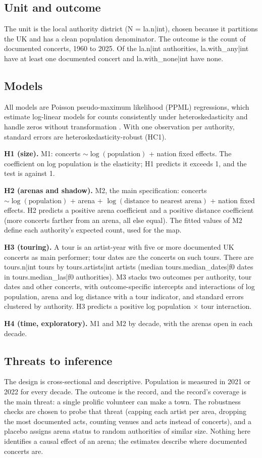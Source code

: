\documentclass[11pt,a4paper]{article}
\begin{document}
\subsection{Unit and outcome}
The unit is the local authority district (N = {{la.n|int}}), chosen because it partitions the UK and has a clean population denominator. The outcome is the count of documented concerts, 1960 to 2025. Of the {{la.n|int}} authorities, {{la.with_any|int}} have at least one documented concert and {{la.with_none|int}} have none.

\subsection{Models}
All models are Poisson pseudo-maximum likelihood (PPML) regressions, which estimate log-linear models for counts consistently under heteroskedasticity and handle zeros without transformation \citep{santos2006}. With one observation per authority, standard errors are heteroskedasticity-robust (HC1).

\textbf{H1 (size).} M1: concerts $\sim \log(\text{population})$ + nation fixed effects. The coefficient on log population is the elasticity; H1 predicts it exceeds 1, and the test is against 1.

\textbf{H2 (arenas and shadow).} M2, the main specification: concerts $\sim \log(\text{population})$ + arena + $\log(\text{distance to nearest arena})$ + nation fixed effects. H2 predicts a positive arena coefficient and a positive distance coefficient (more concerts farther from an arena, all else equal). The fitted values of M2 define each authority's expected count, used for the map.

\textbf{H3 (touring).} A tour is an artist-year with five or more documented UK concerts as main performer; tour dates are the concerts on such tours. There are {{tours.n|int}} tours by {{tours.artists|int}} artists (median {{tours.median_dates|f0}} dates in {{tours.median_las|f0}} authorities). M3 stacks two outcomes per authority, tour dates and other concerts, with outcome-specific intercepts and interactions of log population, arena and log distance with a tour indicator, and standard errors clustered by authority. H3 predicts a positive log population $\times$ tour interaction.

\textbf{H4 (time, exploratory).} M1 and M2 by decade, with the arenas open in each decade.

\subsection{Threats to inference}
The design is cross-sectional and descriptive. Population is measured in 2021 or 2022 for every decade. The outcome is the record, and the record's coverage is the main threat: a single prolific volunteer can make a town. The robustness checks are chosen to probe that threat (capping each artist per area, dropping the most documented acts, counting venues and acts instead of concerts), and a placebo assigns arena status to random authorities of similar size. Nothing here identifies a causal effect of an arena; the estimates describe where documented concerts are.
\end{document}
